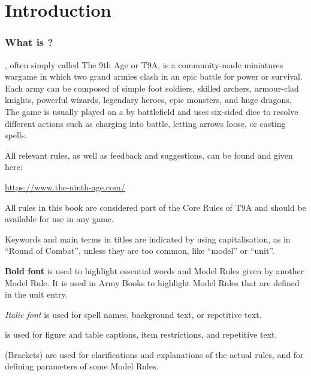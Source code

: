 
\part{Introduction}

\RBbmc

\section{What is \nameofthegame{}?}

\nameofthegame{}, often simply called The 9th Age or T9A, is a community-made miniatures wargame in which two grand armies clash in an epic battle for power or survival. Each army can be composed of simple foot soldiers, skilled archers, armour-clad knights, powerful wizards, legendary heroes, epic monsters, and huge dragons. The game is usually played on a  by  battlefield and uses six-sided dice to resolve different actions such as charging into battle, letting arrows loose, or casting spells.

All relevant rules, as well as feedback and suggestions, can be found and given here:
\begin{center}
\href{https://www.the-ninth-age.com/}{https://www.the-ninth-age.com/}
\end{center}

All rules in this book are considered part of the Core Rules of T9A and should be available for use in any game.


Keywords and main terms in titles are indicated by using capitalisation, as in \enquote{Round of Combat}, unless they are too common, like \enquote{model} or \enquote{unit}.

\textbf{Bold font} is used to highlight essential words and Model Rules given by another Model Rule. It is used in Army Books to highlight Model Rules that are defined in the unit entry.

\textit{Italic font} is used for spell names, background text, or repetitive text.

 is used for figure and table captions, item restrictions, and repetitive text.

(Brackets) are used for clarifications and explanations of the actual rules, and for defining parameters of some Model Rules.

